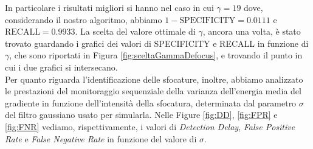 In particolare i risultati migliori si hanno nel caso in cui $\gamma = 19$ dove, considerando il nostro algoritmo, abbiamo $1-\text{SPECIFICITY}=0.0111$ e $\text{RECALL} = 0.9933$.
La scelta del valore ottimale di $\gamma$, ancora una volta, \`e stato trovato guardando i grafici dei valori di SPECIFICITY e RECALL in funzione di $\gamma$, che sono riportati in Figura \ref{fig:sceltaGammaDefocus}, e trovando il punto in cui i due grafici si intersecano.\\
Per quanto riguarda l'identificazione delle sfocature, inoltre, abbiamo analizzato le prestazioni del monitoraggio sequenziale della varianza dell'energia media del gradiente in funzione dell'intensit\`a della sfocatura, determinata dal parametro $\sigma$ del filtro gaussiano usato per simularla.
Nelle Figure \ref{fig:DD}, \ref{fig:FPR} e \ref{fig:FNR} vediamo, rispettivamente, i valori di \textit{Detection Delay}, \textit{False Positive Rate} e \textit{False Negative Rate} in funzione del valore di $\sigma$. 
